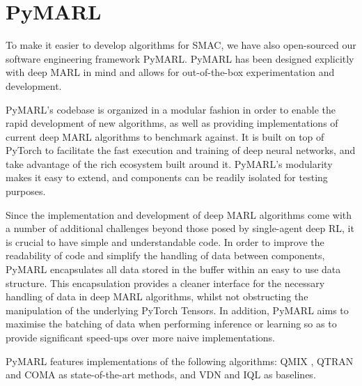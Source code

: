 \section{PyMARL}
\label{sec:pymarl}
To make it easier to develop algorithms for SMAC, we have also open-sourced our software engineering framework PyMARL. PyMARL has been designed explicitly with deep MARL in mind and allows for out-of-the-box experimentation and development.

PyMARL's codebase is organized in a modular fashion in order to enable the rapid development of new algorithms, as well as providing implementations of current deep MARL algorithms to benchmark against. It is built on top of PyTorch to facilitate the fast execution and training of deep neural networks, and take advantage of the rich ecosystem built around it. PyMARL's modularity makes it easy to extend, and components can be readily isolated for testing purposes.

Since the implementation and development of deep MARL algorithms come with a number of additional challenges beyond those posed by single-agent deep RL, it is crucial to have simple and understandable code. In order to improve the readability of code and simplify the handling of data between components, PyMARL encapsulates all data stored in the buffer within an easy to use data structure. This encapsulation provides a cleaner interface for the necessary handling of data in deep MARL algorithms, whilst not obstructing the manipulation of the underlying PyTorch Tensors. In addition, PyMARL aims to maximise the batching of data when performing inference or learning so as to provide significant speed-ups over more naive implementations. 

PyMARL features implementations of the following algorithms: QMIX \cite{rashid_qmix:_2018}, QTRAN \cite{son2019qtran} and COMA \cite{foerster_counterfactual_2017} as state-of-the-art methods, and VDN \cite{sunehag_value-decomposition_2017} and IQL \cite{tan_multi-agent_1993} as baselines.




